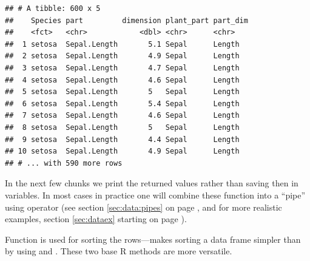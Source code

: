 \documentclass[krantz2]{krantz}\usepackage{knitr}%
\begin{document}
\begin{knitrout}\footnotesize
{}\color{fgcolor}\begin{kframe}
\begin{alltt}
 \hlkwb{<-} 
                     \hlstd{=}  \hlstd{),}
                     \hlstd{=}  \hlstd{))}
\end{alltt}
\begin{verbatim}
## # A tibble: 600 x 5
##    Species part         dimension plant_part part_dim
##    <fct>   <chr>            <dbl> <chr>      <chr>   
##  1 setosa  Sepal.Length       5.1 Sepal      Length  
##  2 setosa  Sepal.Length       4.9 Sepal      Length  
##  3 setosa  Sepal.Length       4.7 Sepal      Length  
##  4 setosa  Sepal.Length       4.6 Sepal      Length  
##  5 setosa  Sepal.Length       5   Sepal      Length  
##  6 setosa  Sepal.Length       5.4 Sepal      Length  
##  7 setosa  Sepal.Length       4.6 Sepal      Length  
##  8 setosa  Sepal.Length       5   Sepal      Length  
##  9 setosa  Sepal.Length       4.4 Sepal      Length  
## 10 setosa  Sepal.Length       4.9 Sepal      Length  
## # ... with 590 more rows
\end{verbatim}
\end{kframe}
\end{knitrout}

In the next few chunks we print the returned values rather than saving then in variables. In most cases in practice one will combine these function into a ``pipe'' using operator \Roperator{\%>\%} (see section \ref{sec:data:pipes} on page \pageref{sec:data:pipes}, and for more realistic examples, section \ref{sec:dataex} starting on page \pageref{sec:dataex}).

Function  is used for sorting the rows---makes sorting a data frame simpler than by using  and . These two base R methods are more versatile.
\end{document}

